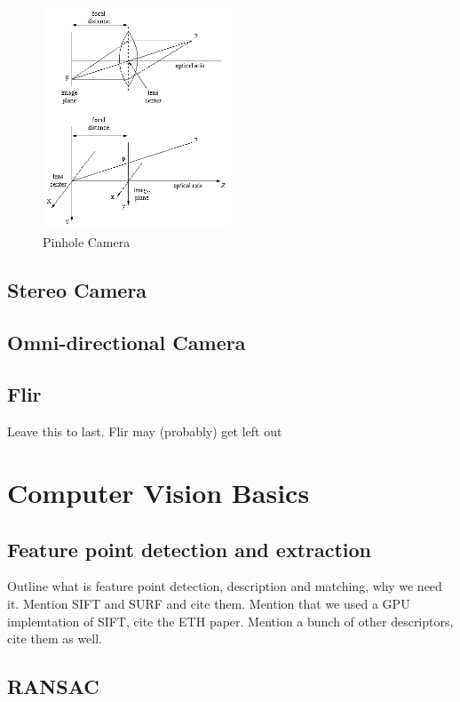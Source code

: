\begin{figure}[h!]
  \caption{Pinhole Camera}
  \centering
    \includegraphics[width=0.5\textwidth]{chapters/images/pinhole_camera}
\end{figure}

\subsection{Stereo Camera}

\subsection{Omni-directional Camera}

\subsection{Flir}
Leave this to last.  Flir may (probably) get left out

\section{Computer Vision Basics}

\subsection{Feature point detection and extraction}

Outline what is feature point detection, description and matching, why we need it.  Mention SIFT
and SURF and cite them.  Mention that we used a GPU implemtation of SIFT, cite the ETH paper. 
Mention a bunch of other descriptors, cite them as well.

\subsection{RANSAC}

